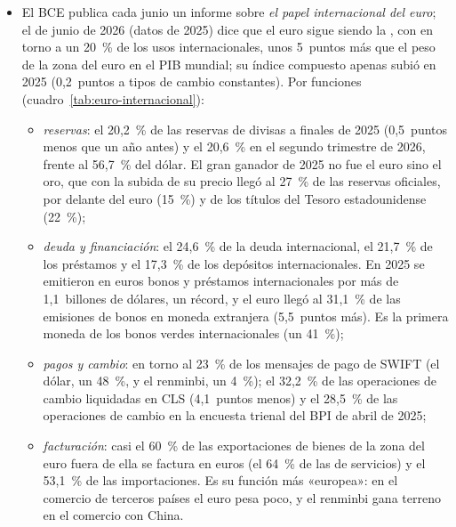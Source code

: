 \documentclass[11pt]{article}
\begin{document}
\begin{itemize}
\item El BCE publica cada junio un informe sobre \emph{el papel internacional del euro}; el de junio de 2026 (datos de 2025)\nocite{BCE2026PapelEuro} dice que el euro sigue siendo la , con en torno a un 20~\% de los usos internacionales, unos 5~puntos más que el peso de la zona del euro en el PIB mundial; su índice compuesto apenas subió en 2025 (0,2~puntos a tipos de cambio constantes). Por funciones (cuadro~\ref{tab:euro-internacional}):
  \begin{itemize}
  \item \emph{reservas}: el 20,2~\% de las reservas de divisas a finales de 2025 (0,5~puntos menos que un año antes) y el 20,6~\% en el segundo trimestre de 2026, frente al 56,7~\% del dólar\nocite{FMI2026COFERNota}. El gran ganador de 2025 no fue el euro sino el oro, que con la subida de su precio llegó al 27~\% de las reservas oficiales, por delante del euro (15~\%) y de los títulos del Tesoro estadounidense (22~\%);
  \item \emph{deuda y financiación}: el 24,6~\% de la deuda internacional, el 21,7~\% de los préstamos y el 17,3~\% de los depósitos internacionales. En 2025 se emitieron en euros bonos y préstamos internacionales por más de 1,1~billones de dólares, un récord, y el euro llegó al 31,1~\% de las emisiones de bonos en moneda extranjera (5,5~puntos más). Es la primera moneda de los bonos verdes internacionales (un 41~\%)\nocite{BCE2026PapelEuro};
  \item \emph{pagos y cambio}: en torno al 23~\% de los mensajes de pago de SWIFT (el dólar, un 48~\%, y el renminbi, un 4~\%); el 32,2~\% de las operaciones de cambio liquidadas en CLS (4,1~puntos menos) y el 28,5~\% de las operaciones de cambio en la encuesta trienal del BPI de abril de 2025\nocite{BCE2026PapelEuro};
  \item \emph{facturación}: casi el 60~\% de las exportaciones de bienes de la zona del euro fuera de ella se factura en euros (el 64~\% de las de servicios) y el 53,1~\% de las importaciones. Es su función más «europea»: en el comercio de terceros países el euro pesa poco, y el renminbi gana terreno en el comercio con China.
  \end{itemize}
\end{itemize}
\end{document}
